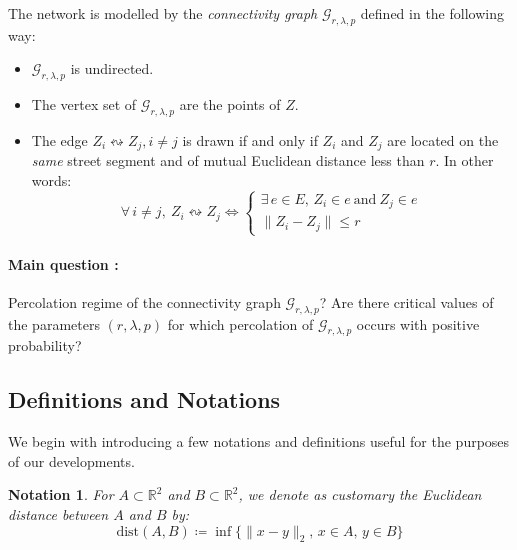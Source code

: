 \documentclass[10pt,a4paper]{amsart}
\theoremstyle{exampstyle}
\newtheorem{Remark}{Remark}
\theoremstyle{exampnotations}
\newtheorem{Notation}{Notation}
\begin{document}
The network is modelled by the \emph{connectivity graph} $\mathcal{G}_{r,\lambda,p}$ defined in the following way:
\begin{itemize}
\item $\mathcal{G}_{r,\lambda,p}$ is undirected.
\item The vertex set of $\mathcal{G}_{r,\lambda,p}$ are the points of $Z$.
\item The edge $Z_{i} \leftrightsquigarrow Z_{j}, i \neq j$ is drawn if and only if $Z_{i}$ and $Z_{j}$ are located on the \emph{same} street segment and of mutual Euclidean distance less than $r$. In other words:
\begin{equation}
\label{connectivity_mechanism}
\forall \, i \neq j, \: Z_{i} \leftrightsquigarrow Z_{j} \Leftrightarrow 
\left\{
\begin{array}{l}
\exists \, e \in E, \, Z_{i} \in e  \  \text{and} \  Z_{j} \in e \\
\lVert Z_{i} - Z_{j} \rVert \leq r
\end{array}
\right.
\end{equation}
\end{itemize}


\paragraph*{Main question :} Percolation regime of the connectivity graph $\mathcal{G}_{r,\lambda, p}$? Are there critical values of the parameters $(r,\lambda,p)$ for which percolation of $\mathcal{G}_{r,\lambda, p}$ occurs with positive probability?

\subsection{Definitions and Notations}
We begin with introducing a few notations and definitions useful for the purposes of our developments.
 \begin{Notation}
 For $A \subset \mathbb{R}^{2}$ and $B \subset \mathbb{R}^{2}$, we denote as customary the Euclidean distance between $A$ and $B$ by:
 $$\text{dist}(A,B) \coloneqq \inf \lbrace \lVert x - y \rVert_{2} , \,  x \in A, \,  y \in B \rbrace$$
 \end{Notation}
\end{document}

